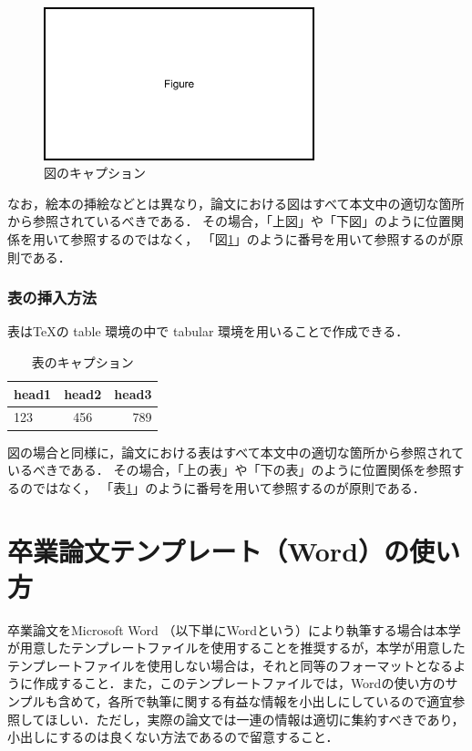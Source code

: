 \begin{figure}[bthp]
    \centering
    \includegraphics[width=0.7\textwidth]{fig1.png}
    \caption{図のキャプション}
    \label{fig:my_label}
\end{figure}

なお，絵本の挿絵などとは異なり，論文における図はすべて本文中の適切な箇所から参照されているべきである．
その場合，「上図」や「下図」のように位置関係を用いて参照するのではなく，
「図\ref{fig:my_label}」のように番号を用いて参照するのが原則である．

\subsubsection{表の挿入方法}
表は\TeX の table 環境の中で tabular 環境を用いることで作成できる．

\begin{table}[tbhp]
    \caption{表のキャプション}
    \centering
    \begin{tabular}{lcr}
        \hline
        head1 & head2 & head3 \\ 
        \hline\hline
        123 & 456 & 789\\
        \hline
    \end{tabular}
    \label{tab:my_label}
\end{table}

図の場合と同様に，論文における表はすべて本文中の適切な箇所から参照されているべきである．
その場合，「上の表」や「下の表」のように位置関係を参照するのではなく，
「表\ref{tab:my_label}」のように番号を用いて参照するのが原則である．

\section{卒業論文テンプレート（Word）の使い方}

卒業論文をMicrosoft Word （以下単にWordという）により執筆する場合は本学が用意したテンプレートファイルを使用することを推奨するが，本学が用意したテンプレートファイルを使用しない場合は，それと同等のフォーマットとなるように作成すること．また，このテンプレートファイルでは，Wordの使い方のサンプルも含めて，各所で執筆に関する有益な情報を小出しにしているので適宜参照してほしい．ただし，実際の論文では一連の情報は適切に集約すべきであり，小出しにするのは良くない方法であるので留意すること．

